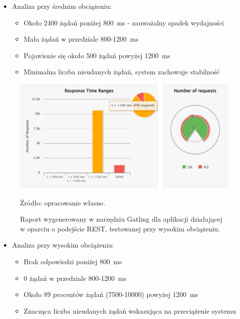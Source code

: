 \documentclass[runningheads,12pt]{llncs}
\begin{document}
\begin{itemize}
  \item Analiza przy średnim obciążeniu:
  \begin{itemize}
    \item Około 2400 żądań poniżej 800~ms - zauważalny spadek wydajności
    \item Mała żądań w przedziale 800-1200~ms
    \item Pojawienie się około 500 żądań powyżej 1200~ms
    \item Minimalna liczba nieudanych żądań, system zachowuje stabilność
  \end{itemize}
\end{itemize}

\newpage

\begin{figure}
    \includegraphics[width=\linewidth]{images/rest-gatling-high-graph.jpg}
    \caption{Raport wygenerowany w narzędziu Gatling dla aplikacji działającej w oparciu o podejście REST, testowanej przy wysokim obciążeniu.} \label{fig3}
    \vspace{0.5em}
    {\small Źródło: opracowanie własne.}
\end{figure}

\begin{itemize}
  \item Analiza przy wysokim obciążeniu:
  \begin{itemize}
    \item Brak odpowiedzi poniżej 800~ms
    \item 0 żądań w przedziale 800-1200~ms
    \item Około 89 procentów żądań (7500-10000) powyżej 1200~ms
    \item Znacząca liczba nieudanych żądań wskazująca na przeciążenie systemu
  \end{itemize}
\end{itemize}
\end{document}
